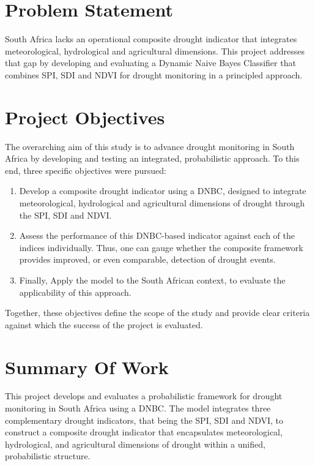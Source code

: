 \section{Problem Statement}

South Africa lacks an operational composite drought indicator that integrates meteorological, hydrological and agricultural dimensions. This project addresses that gap by developing and evaluating a Dynamic Naive Bayes Classifier that combines SPI, SDI and NDVI for drought monitoring in a principled approach.

\section{Project Objectives}

The overarching aim of this study is to advance drought monitoring in South Africa by developing and testing an integrated, probabilistic approach. To this end, three specific objectives were pursued:
\begin{enumerate}
    \item Develop a composite drought indicator using a DNBC, designed to integrate meteorological, hydrological and agricultural dimensions of drought through the SPI, SDI and NDVI. 
    \item Assess the performance of this DNBC-based indicator against each of the indices individually. Thus, one can gauge whether the composite framework provides improved, or even comparable, detection of drought events. 
    \item Finally, Apply the model to the South African context, to evaluate the applicability of this approach. \end{enumerate}

Together, these objectives define the scope of the study and provide clear criteria against which the success of the project is evaluated.

\section{Summary Of Work}

This project develops and evaluates a probabilistic framework for drought monitoring in South Africa using a DNBC. The model integrates three complementary drought indicators, that being the SPI, SDI and NDVI, to construct a composite drought indicator that encapsulates meteorological, hydrological, and agricultural dimensions of drought within a unified, probabilistic structure.

